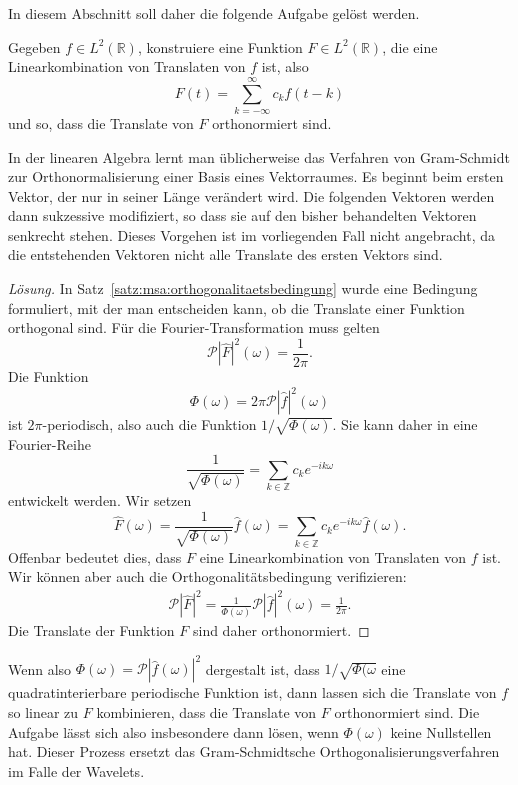 
In diesem Abschnitt soll daher die folgende Aufgabe gelöst werden.
\begin{aufgabe}
\label{aufgabe:orthonormalisierung}
Gegeben $f\in L^2(\mathbb R)$, konstruiere eine Funktion 
$F\in L^2(\mathbb R)$, die eine Linearkombination von 
Translaten von $f$ ist, also
\[
F(t) = \sum_{k=-\infty}^\infty c_k f(t-k)
\]
und so, dass die Translate von $F$ orthonormiert sind.
\end{aufgabe}

In der linearen Algebra lernt man üblicherweise das Verfahren von
Gram-Schmidt zur Orthonormalisierung einer Basis eines Vektorraumes.
Es beginnt beim ersten Vektor, der nur in seiner Länge verändert wird.
Die folgenden Vektoren werden dann sukzessive modifiziert, so dass sie
auf den bisher behandelten Vektoren senkrecht stehen.
Dieses Vorgehen ist im vorliegenden Fall nicht angebracht, da die
entstehenden Vektoren nicht alle Translate des ersten Vektors sind.

\begin{proof}[Lösung]
In Satz~\ref{satz:msa:orthogonalitaetsbedingung} wurde eine Bedingung
formuliert, mit der man entscheiden kann, ob die Translate einer 
Funktion orthogonal sind.
Für die Fourier-Transformation muss gelten
\[
\mathcal{P}|\hat{F}|^2(\omega)
=
\frac{1}{2\pi}.
\]
Die Funktion 
\[
\Phi(\omega)
=
2\pi\mathcal{P}|\hat{f}|^2(\omega)
\]
ist $2\pi$-periodisch, also auch die Funktion $1/\sqrt{\Phi(\omega)}$.
Sie kann daher in eine Fourier-Reihe
\[
\frac{1}{\sqrt{\Phi(\omega)}}
=
\sum_{k\in\mathbb Z} c_ke^{-ik\omega}
\]
entwickelt werden.
Wir setzen 
\[
\hat{F}(\omega)
=
\frac{1}{\sqrt{\Phi(\omega)}} 
\hat{f}(\omega)
=
\sum_{k\in\mathbb Z} c_ke^{-ik\omega}\hat{f}(\omega).
\]
Offenbar bedeutet dies, dass $F$ eine Linearkombination von Translaten
von $f$ ist.
Wir können aber auch die Orthogonalitätsbedingung verifizieren:
\begin{align*}
\mathcal{P}|\hat{F}|^2
=
\frac{1}{\Phi(\omega)} \mathcal{P}|\hat{f}|^2(\omega)
=
\frac{1}{2\pi}.
\end{align*}
Die Translate der Funktion $F$ sind daher orthonormiert.
\end{proof}

Wenn also
$\Phi(\omega)=\mathcal{P}|\hat{f}(\omega)|^2$ dergestalt ist, dass 
$1/\sqrt{\Phi(\omega}$ eine quadratinterierbare periodische Funktion ist,
dann lassen sich die Translate von $f$ so linear zu $F$ kombinieren, dass die
Translate von $F$ orthonormiert sind.
Die Aufgabe lässt sich also insbesondere dann lösen, wenn $\Phi(\omega)$
keine Nullstellen hat.
Dieser Prozess ersetzt das Gram-Schmidtsche Orthogonalisierungsverfahren
im Falle der Wavelets.





